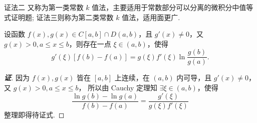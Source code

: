 证法二 又称为第一类常数 $k$ 值法，主要适用于常数部分可以分离的微积分中值等式证明题; 证法三则称为第二类常数 $k$ 值法，适用面更广.
\begin{inference}
    设函数 $f(x),g(x)\in C[a,b]\cap D(a,b)$，且 $g'(x)\neq0$，又 $g(x)>0,a\leqslant x\leqslant b$，则存在一点 $\xi\in(a,b)$，使得\label{gfbfagf}
    $$g'(\xi)  \left[ f(b)  -f(a)  \right] =g(\xi)  f'(\xi)  \ln \dfrac{g(b)  }{g(a)  }.$$
\end{inference}
\begin{proof}[{\songti \textbf{证}}]
    因为 $f(x),g(x)$ 皆在 $[a,b]$ 上连续，在 $(a,b)$ 内可导，且 $g'(x)\neq0$，又 $g(x)>0,a\leqslant x\leqslant b$，
    所以由 Cauchy 定理知 $\exists\xi\in(a,b)$，使得
    $$\dfrac{\ln g(b)-\ln g(a)}{f(b)-f(a)}=\dfrac{g'(\xi)}{g(\xi)f'(\xi)}$$
    整理即得待证式.
\end{proof}

